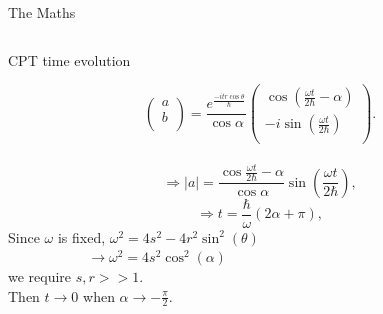\documentclass[10pt]{beamer}
\begin{document}
\begin{frame}{The Maths}
\begin{columns}
    \pause
    \begin{column}{0.5\textwidth}
    \vspace{2cm}
    \textcolor{myNewColorC}{CPT} time evolution\\
    \vspace{-1cm}
    \begin{scriptsize}
    \begin{equation*}
        \begin{pmatrix}
                a \\
                b \\                
        \end{pmatrix} = \frac{e^{\frac{-itr \cos\theta}{\hbar}}}{\cos{\alpha}}
        \begin{pmatrix}
                \cos(\frac{\omega t}{2 \hbar} - \alpha)\\
                - i \sin(\frac{\omega t}{2\hbar})\\
        \end{pmatrix}.
    \end{equation*}\\
    \pause
    \begin{equation*}
    \Rightarrow |a|= \frac{\cos{\frac{\omega t}{2 \hbar} -\alpha}}{\cos{\alpha}} \sin\left(\frac{\omega t}{2\hbar}\right),
    \end{equation*}
    \pause
    \begin{equation*}
    \Rightarrow t = \frac{\hbar}{\omega}(2 \alpha + \pi) ,
    \end{equation*}
    \pause
    Since $\omega$ is fixed,
    \textcolor{myNewColorD}{$\omega^2 = 4s^2 - 4r^2 \sin^{2}(\theta)$}\\
    $\quad\quad\quad\quad\:\:\:\quad \to \omega^2 = 4s^2\cos^2(\alpha)$\\
    we require $s, r >> 1$.\\
    \pause
    \vspace{0.5cm}
    Then $t \to 0$ when $\alpha \to -\frac{\pi}{2}$.\\
    \end{scriptsize}
    \end{column}
\end{columns}
\end{frame}
\end{document}
